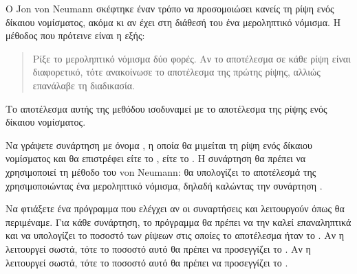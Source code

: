\documentclass[a4paper,11pt,oneside]{book}
\begin{document}
\begin{exercise}
Ο Jon von Neumann %
σκέφτηκε έναν τρόπο να προσομοιώσει κανείς τη ρίψη ενός δίκαιου νομίσματος, ακόμα κι αν έχει στη διάθεσή του ένα μεροληπτικό νόμισμα. Η μέθοδος που πρότεινε είναι η εξής:
\begin{quote}
Ρίξε το μεροληπτικό νόμισμα δύο φορές. Αν το αποτέλεσμα σε κάθε ρίψη είναι διαφορετικό, τότε ανακοίνωσε το αποτέλεσμα της πρώτης ρίψης, αλλιώς επανάλαβε τη διαδικασία. 
\end{quote}
Το αποτέλεσμα αυτής της μεθόδου ισοδυναμεί με το αποτέλεσμα της ρίψης ενός δίκαιου νομίσματος. 

Να γράψετε συνάρτηση με όνομα , η οποία θα μιμείται τη ρίψη ενός δίκαιου νομίσματος και θα επιστρέφει είτε το , είτε το . Η συνάρτηση θα πρέπει να χρησιμοποιεί τη μέθοδο του von Neumann: θα υπολογίζει το αποτέλεσμά της χρησιμοποιώντας ένα μεροληπτικό νόμισμα, δηλαδή καλώντας την συνάρτηση .

Να φτιάξετε ένα πρόγραμμα που ελέγχει αν οι συναρτήσεις  και  λειτουργούν όπως θα περιμέναμε.
Για κάθε συνάρτηση, το πρόγραμμα θα πρέπει να την καλεί επαναληπτικά  και να υπολογίζει το ποσοστό των ρίψεων στις οποίες το αποτέλεσμα ήταν το . Αν η  λειτουργεί σωστά, τότε το ποσοστό αυτό θα πρέπει να προσεγγίζει το . Αν η  λειτουργεί σωστά, τότε το ποσοστό αυτό θα πρέπει να προσεγγίζει το . 


\end{exercise}
\end{document}
